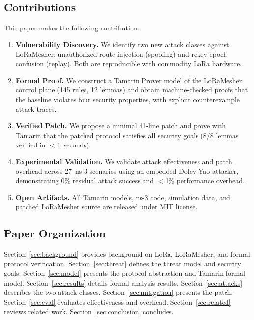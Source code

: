 \documentclass[journal]{IEEEtran}
\begin{document}
\subsection{Contributions}

This paper makes the following contributions:

\begin{enumerate}
  \item \textbf{Vulnerability Discovery.} We identify two new attack
    classes against LoRaMesher: unauthorized route injection (spoofing)
    and rekey-epoch confusion (replay). Both are reproducible with
    commodity LoRa hardware.

  \item \textbf{Formal Proof.} We construct a Tamarin Prover model of
    the LoRaMesher control plane (145 rules, 12 lemmas) and obtain
    machine-checked proofs that the baseline violates four security
    properties, with explicit counterexample attack traces.

  \item \textbf{Verified Patch.} We propose a minimal 41-line patch
    and prove with Tamarin that the patched protocol satisfies all
    security goals (8/8 lemmas verified in $<$4~seconds).

  \item \textbf{Experimental Validation.} We validate attack
    effectiveness and patch overhead across 27~ns-3 scenarios using an
    embedded Dolev-Yao attacker, demonstrating 0\% residual attack
    success and $<$1\% performance overhead.

  \item \textbf{Open Artifacts.} All Tamarin models, ns-3 code,
    simulation data, and patched LoRaMesher source are released under
    MIT license.
\end{enumerate}

\subsection{Paper Organization}

Section~\ref{sec:background} provides background on LoRa, LoRaMesher,
and formal protocol verification. Section~\ref{sec:threat} defines the
threat model and security goals. Section~\ref{sec:model} presents the
protocol abstraction and Tamarin formal model. Section~\ref{sec:results}
details formal analysis results. Section~\ref{sec:attacks} describes the
two attack classes. Section~\ref{sec:mitigation} presents the patch.
Section~\ref{sec:eval} evaluates effectiveness and overhead.
Section~\ref{sec:related} reviews related work.
Section~\ref{sec:conclusion} concludes.
\end{document}
